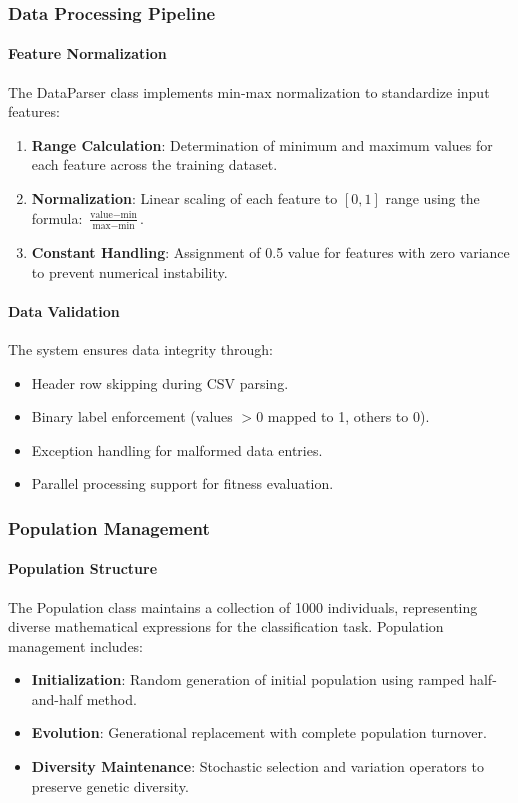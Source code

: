 \documentclass[a4paper,12pt]{article}
\begin{document}
\subsubsection{Data Processing Pipeline}
\paragraph{Feature Normalization}
The DataParser class implements min-max normalization to standardize input features:
\begin{enumerate}
    \item \textbf{Range Calculation}: Determination of minimum and maximum values for each feature across the training dataset.
    \item \textbf{Normalization}: Linear scaling of each feature to $[0,1]$ range using the formula: $\frac{\text{value} - \text{min}}{\text{max} - \text{min}}$.
    \item \textbf{Constant Handling}: Assignment of 0.5 value for features with zero variance to prevent numerical instability.
\end{enumerate}

\paragraph{Data Validation}
The system ensures data integrity through:
\begin{itemize}
    \item Header row skipping during CSV parsing.
    \item Binary label enforcement (values $> 0$ mapped to 1, others to 0).
    \item Exception handling for malformed data entries.
    \item Parallel processing support for fitness evaluation.
\end{itemize}

\subsubsection{Population Management}
\paragraph{Population Structure}
The Population class maintains a collection of 1000 individuals, representing diverse mathematical expressions for the classification task. Population management includes:
\begin{itemize}
    \item \textbf{Initialization}: Random generation of initial population using ramped half-and-half method.
    \item \textbf{Evolution}: Generational replacement with complete population turnover.
    \item \textbf{Diversity Maintenance}: Stochastic selection and variation operators to preserve genetic diversity.
\end{itemize}
\end{document}
